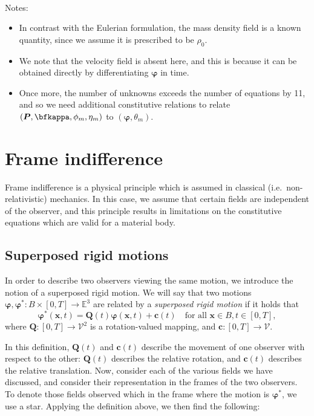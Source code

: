 \documentclass[
  letterpaper,
  DIV=11,
  numbers=noendperiod]{scrreprt}
\makeatletter
\let\oldparagraph\paragraph
\renewcommand{\paragraph}{
    \@ifstar
      \xxxParagraphStar
      \xxxParagraphNoStar
  }
\newcommand{\xxxParagraphStar}[1]{\oldparagraph*{#1}\mbox{}}
\newcommand{\xxxParagraphNoStar}[1]{\oldparagraph{#1}\mbox{}}
\theoremstyle{plain}
\theoremstyle{remark}
\makeatother
\begin{document}
\paragraph{Notes:}\label{notes}

\begin{itemize}
\item
  In contrast with the Eulerian formulation, the mass density field is a
  known quantity, since we assume it is prescribed to be \(\rho_0\).
\item
  We note that the velocity field is absent here, and this is because it
  can be obtained directly by differentiating \({\boldsymbol{\varphi}}\)
  in time.
\item
  Once more, the number of unknowns exceeds the number of equations by
  11, and so we need additional constitutive relations to relate
  \(({\boldsymbol{P}},\bfkappa,\phi_m,\eta_m)\) to
  \(({\boldsymbol{\varphi}},\theta_m)\).
\end{itemize}

\section{Frame indifference}\label{frame-indifference}

Frame indifference is a physical principle which is assumed in classical
(i.e.~non-relativistic) mechanics. In this case, we assume that certain
fields are independent of the observer, and this principle results in
limitations on the constitutive equations which are valid for a material
body.

\subsection{Superposed rigid motions}\label{superposed-rigid-motions}

In order to describe two observers viewing the same motion, we introduce
the notion of a superposed rigid motion. We will say that two motions
\({\boldsymbol{\varphi}},{\boldsymbol{\varphi}}^*:B\times[0,T]\to{\mathbb{E}}^3\)
are related by a \emph{superposed rigid motion} if it holds that
\[{\boldsymbol{\varphi}}^*({\boldsymbol{x}},t) = {\boldsymbol{Q}}(t){\boldsymbol{\varphi}}({\boldsymbol{x}},t)+{\boldsymbol{c}}(t)\quad\text{for all }{\boldsymbol{x}}\in B, t\in[0,T],\]
where \({\boldsymbol{Q}}:[0,T]\to{\mathcal{V}}^2\) is a rotation-valued
mapping, and \({\boldsymbol{c}}:[0,T]\to{\mathcal{V}}\).

In this definition, \({\boldsymbol{Q}}(t)\) and \({\boldsymbol{c}}(t)\)
describe the movement of one observer with respect to the other:
\({\boldsymbol{Q}}(t)\) describes the relative rotation, and
\({\boldsymbol{c}}(t)\) describes the relative translation. Now,
consider each of the various fields we have discussed, and consider
their representation in the frames of the two observers. To denote those
fields observed which in the frame where the motion is
\({\boldsymbol{\varphi}}^*\), we use a star. Applying the definition
above, we then find the following:
\end{document}
